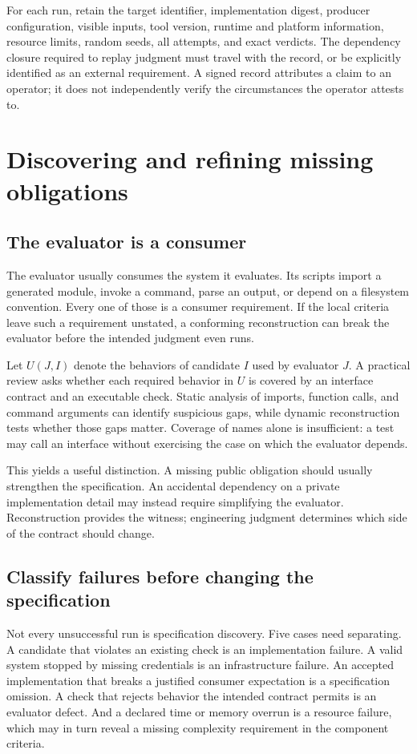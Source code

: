 \documentclass[10pt,twocolumn,letterpaper]{article}
\begin{document}
For each run, retain the target identifier, implementation digest, producer configuration, visible inputs, tool version, runtime and platform information, resource limits, random seeds, all attempts, and exact verdicts. The dependency closure required to replay judgment must travel with the record, or be explicitly identified as an external requirement. A signed record attributes a claim to an operator; it does not independently verify the circumstances the operator attests to.

\section{Discovering and refining missing obligations}
\label{sec:obligations}
\subsection{The evaluator is a consumer}
The evaluator usually consumes the system it evaluates. Its scripts import a generated module, invoke a command, parse an output, or depend on a filesystem convention. Every one of those is a consumer requirement. If the local criteria leave such a requirement unstated, a conforming reconstruction can break the evaluator before the intended judgment even runs.

Let $U(J,I)$ denote the behaviors of candidate $I$ used by evaluator $J$. A practical review asks whether each required behavior in $U$ is covered by an interface contract and an executable check. Static analysis of imports, function calls, and command arguments can identify suspicious gaps, while dynamic reconstruction tests whether those gaps matter. Coverage of names alone is insufficient: a test may call an interface without exercising the case on which the evaluator depends.

This yields a useful distinction. A missing public obligation should usually strengthen the specification. An accidental dependency on a private implementation detail may instead require simplifying the evaluator. Reconstruction provides the witness; engineering judgment determines which side of the contract should change.

\subsection{Classify failures before changing the specification}
\label{sec:classify}
Not every unsuccessful run is specification discovery. Five cases need separating. A candidate that violates an existing check is an implementation failure. A valid system stopped by missing credentials is an infrastructure failure. An accepted implementation that breaks a justified consumer expectation is a specification omission. A check that rejects behavior the intended contract permits is an evaluator defect. And a declared time or memory overrun is a resource failure, which may in turn reveal a missing complexity requirement in the component criteria.
\end{document}
